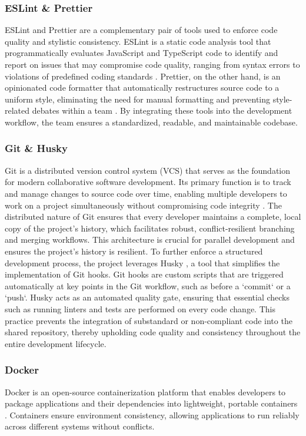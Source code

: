 \subsubsection{ESLint \& Prettier}
ESLint  and Prettier are a complementary pair of tools used to enforce code quality and stylistic consistency. ESLint is a static code analysis tool that programmatically evaluates JavaScript and TypeScript code to identify and report on issues that may compromise code quality, ranging from syntax errors to violations of predefined coding standards \cite{eslint2025gettingstarted}. Prettier, on the other hand, is an opinionated code formatter that automatically restructures source code to a uniform style, eliminating the need for manual formatting and preventing style-related debates within a team \cite{prettier2025docs}. By integrating these tools into the development workflow, the team ensures a standardized, readable, and maintainable codebase.

\subsubsection{Git \& Husky}
Git is a distributed version control system (VCS) that serves as the foundation for modern collaborative software development. Its primary function is to track and manage changes to source code over time, enabling multiple developers to work on a project simultaneously without compromising code integrity \cite{git2025docs}. The distributed nature of Git ensures that every developer maintains a complete, local copy of the project's history, which facilitates robust, conflict-resilient branching and merging workflows. This architecture is crucial for parallel development and ensures the project's history is resilient.
To further enforce a structured development process, the project leverages Husky \cite{husky2025docs}, a tool that simplifies the implementation of Git hooks. Git hooks are custom scripts that are triggered automatically at key points in the Git workflow, such as before a `commit` or a `push`. Husky acts as an automated quality gate, ensuring that essential checks such as running linters and tests are performed on every code change. This practice prevents the integration of substandard or non-compliant code into the shared repository, thereby upholding code quality and consistency throughout the entire development lifecycle.


\subsubsection{Docker}
Docker is an open-source containerization platform that enables developers to package applications and their dependencies into lightweight, portable containers \cite{docker2025overview}. Containers ensure environment consistency, allowing applications to run reliably across different systems without conflicts. 

